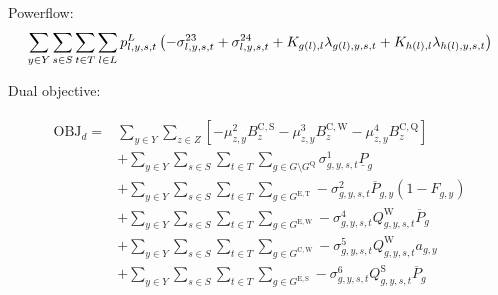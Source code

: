 \documentclass{article}
\newcommand{\sGenerators}{G}
\newcommand{\sGeneratorsExistingThermal}{G^{\mathrm{E,T}}}
\newcommand{\sGeneratorsExistingWind}{G^{\mathrm{E,W}}}
\newcommand{\sGeneratorsExistingSolar}{G^{\mathrm{E,S}}}
\newcommand{\sGeneratorsCandidateThermal}{G^{\mathrm{C,T}}}
\newcommand{\sGeneratorsCandidateWind}{G^{\mathrm{C,W}}}
\newcommand{\sStorage}{G^{\mathrm{Q}}}
\newcommand{\sYears}{Y}
\newcommand{\sScenarios}{S}
\newcommand{\sIntervals}{T}
\newcommand{\sZones}{Z}
\newcommand{\sLinks}{L}
\newcommand{\iGenerator}{g}
\newcommand{\iYear}{y}
\newcommand{\iScenario}{s}
\newcommand{\iInterval}{t}
\newcommand{\iZone}{z}
\newcommand{\iLink}{l}
\newcommand{\cPowerOutputMax}[1][\iGenerator,\iYear]{\overline{P}_{#1}}
\newcommand{\cBuildLimitWind}{B^{\mathrm{C,\mathrm{W}}}_{\iZone}}
\newcommand{\cBuildLimitSolar}{B^{\mathrm{C,\mathrm{S}}}_{\iZone}}
\newcommand{\cBuildLimitStorage}{B^{\mathrm{C,\mathrm{Q}}}_{\iZone}}
\newcommand{\cPowerOutputMin}[1][\iGenerator]{\underline{P}_{#1}}
\newcommand{\cCapacityFactorWind}[1][\iGenerator,\iYear,\iScenario,\iInterval]{Q_{#1}^{\mathrm{W}}}
\newcommand{\cCapacityFactorSolar}[1][\iGenerator,\iYear,\iScenario,\iInterval]{Q_{#1}^{\mathrm{S}}}
\newcommand{\cIncidenceMatrix}[1][\iZone,\iLink]{K_{#1}}
\newcommand{\cRetirementIndicator}[1][\iGenerator,\iYear]{F_{#1}}
\newcommand{\vPower}[1][\iGenerator,\iYear,\iScenario,\iInterval]{p_{#1}}
\newcommand{\vPowerFlow}[1][\iLink,\iYear,\iScenario,\iInterval]{p^{\sLinks}_{#1}}
\newcommand{\vInstalledCapacityTotal}[1][\iGenerator,\iYear]{a_{#1}}
\newcommand{\dSolarBuildLimit}[1][\iZone,\iYear]{\mu_{#1}^{2}}
\newcommand{\dWindBuildLimit}[1][\iZone,\iYear]{\mu_{#1}^{3}}
\newcommand{\dStorageBuildLimit}[1][\iZone,\iYear]{\mu_{#1}^{4}}
\newcommand{\dMinPowerOutput}[1][\iGenerator,\iYear,\iScenario,\iInterval]{\sigma_{#1}^{1}}
\newcommand{\dMaxPowerOutputExistingThermal}[1][\iGenerator,\iYear,\iScenario,\iInterval]{\sigma_{#1}^{2}}
\newcommand{\dMaxPowerOutputCandidateThermal}[1][\iGenerator,\iYear,\iScenario,\iInterval]{\sigma_{#1}^{3}}
\newcommand{\dMaxPowerOutputWindExisting}[1][\iGenerator,\iYear,\iScenario,\iInterval]{\sigma_{#1}^{4}}
\newcommand{\dMaxPowerOutputWindCandidate}[1][\iGenerator,\iYear,\iScenario,\iInterval]{\sigma_{#1}^{5}}
\newcommand{\dMaxPowerOutputSolarExisting}[1][\iGenerator,\iYear,\iScenario,\iInterval]{\sigma_{#1}^{6}}
\newcommand{\dMinPowerFlow}[1][\iLink,\iYear,\iScenario,\iInterval]{\sigma_{#1}^{23}}
\newcommand{\dMaxPowerFlow}[1][\iLink,\iYear,\iScenario,\iInterval]{\sigma_{#1}^{24}}
\newcommand{\dPowerBalance}[1][\iZone,\iYear,\iScenario,\iInterval]{\lambda_{#1}}
\begin{document}
Powerflow:
\begin{equation}
	\sumIntervals \sum\limits_{\iLink \in \sLinks} \vPowerFlow \left(-\dMinPowerFlow + \dMaxPowerFlow + \cIncidenceMatrix[g(\iLink), \iLink] \dPowerBalance[g(\iLink),\iYear,\iScenario,\iInterval] + \cIncidenceMatrix[h(\iLink), \iLink] \dPowerBalance[h(\iLink),\iYear,\iScenario,\iInterval]\right)
\end{equation}

Dual objective:

\begin{align}
\begin{split}
\textrm{OBJ}_{d} =  & \sum\limits_{\iYear \in \sYears} \sum\limits_{\iZone \in \sZones} \left[- \dSolarBuildLimit \cBuildLimitSolar - \dWindBuildLimit \cBuildLimitWind - \dStorageBuildLimit \cBuildLimitStorage\right]\\
& + \sum\limits_{\iYear \in \sYears}\sum\limits_{\iScenario \in \sScenarios}\sum\limits_{\iInterval \in \sIntervals} \sum\limits_{\iGenerator \in \sGenerators \setminus \sStorage} \dMinPowerOutput \cPowerOutputMin\\
& + \sum\limits_{\iYear \in \sYears}\sum\limits_{\iScenario \in \sScenarios}\sum\limits_{\iInterval \in \sIntervals} \sum\limits_{\iGenerator \in \sGeneratorsExistingThermal} - \dMaxPowerOutputExistingThermal \cPowerOutputMax \left(1 - \cRetirementIndicator\right)\\
& + \sum\limits_{\iYear \in \sYears}\sum\limits_{\iScenario \in \sScenarios}\sum\limits_{\iInterval \in \sIntervals} \sum\limits_{\iGenerator \in \sGeneratorsExistingWind} - \dMaxPowerOutputWindExisting \cCapacityFactorWind \cPowerOutputMax[\iGenerator]\\
& + \sum\limits_{\iYear \in \sYears}\sum\limits_{\iScenario \in \sScenarios}\sum\limits_{\iInterval \in \sIntervals} \sum\limits_{\iGenerator \in \sGeneratorsCandidateWind} - \dMaxPowerOutputWindCandidate \cCapacityFactorWind \vInstalledCapacityTotal\\
& + \sum\limits_{\iYear \in \sYears}\sum\limits_{\iScenario \in \sScenarios}\sum\limits_{\iInterval \in \sIntervals} \sum\limits_{\iGenerator \in \sGeneratorsExistingSolar} - \dMaxPowerOutputSolarExisting \cCapacityFactorSolar \cPowerOutputMax[\iGenerator]\\

\end{split}
\end{align}
\end{document}
